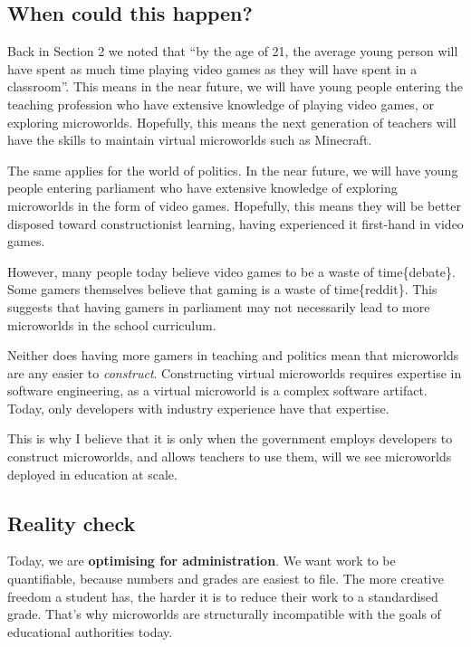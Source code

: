 \subsection{When could this happen?}

Back in Section 2 we noted that ``by the age of 21, the average young
person will have spent as much time playing video games as they will
have spent in a classroom''. This means in the near future, we will have
young people entering the teaching profession who have extensive
knowledge of playing video games, or exploring microworlds. Hopefully,
this means the next generation of teachers will have the skills to
maintain virtual microworlds such as Minecraft.

The same applies for the world of politics. In the near future, we will
have young people entering parliament who have extensive knowledge of
exploring microworlds in the form of video games. Hopefully, this means
they will be better disposed toward constructionist learning, having
experienced it first-hand in video games.

However, many people today believe video games to be a waste of
time\{debate\}. Some gamers themselves believe that gaming is a waste of
time\{reddit\}. This suggests that having gamers in parliament may not
necessarily lead to more microworlds in the school curriculum.

Neither does having more gamers in teaching and politics mean that
microworlds are any easier to \emph{construct}. Constructing virtual
microworlds requires expertise in software engineering, as a virtual
microworld is a complex software artifact. Today, only developers with
industry experience have that expertise.

This is why I believe that it is only when the government employs
developers to construct microworlds, and allows teachers to use them,
will we see microworlds deployed in education at scale.

\subsection{Reality check}

Today, we are \textbf{optimising for administration}. We want work to be quantifiable, because numbers and grades are easiest to file. The more creative freedom a student has, the harder it is to reduce their work to a standardised grade. That's why microworlds are structurally incompatible with the goals of educational authorities today.

